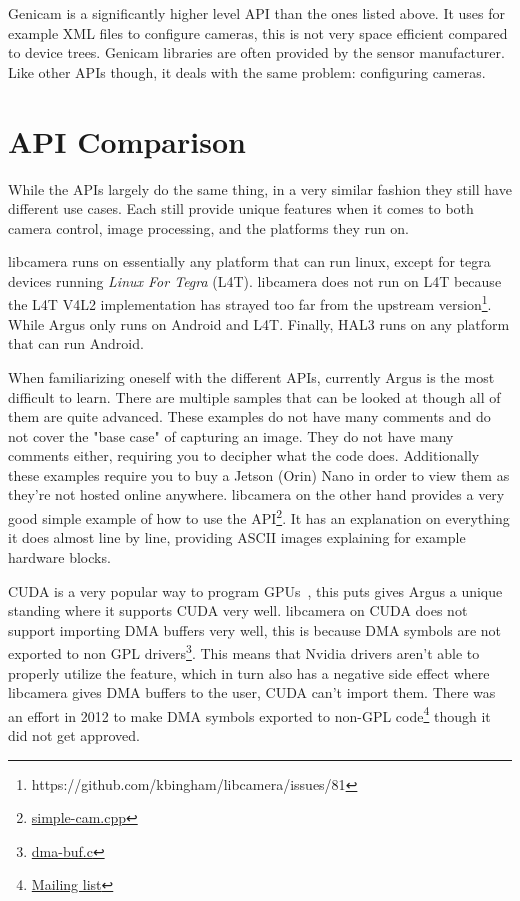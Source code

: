 Genicam is a significantly higher level API than the ones listed above. It
uses for example XML files to configure cameras, this is not very space
efficient compared to device trees. Genicam libraries are often provided by the
sensor manufacturer. Like other APIs though, it deals with the same problem:
configuring cameras.

\section{API Comparison}\label{section:comparison}
While the APIs largely do the same thing, in a very similar fashion they still
have different use cases. Each still provide unique features when it comes to
both camera control, image processing, and the platforms they run on.

libcamera runs on essentially any platform that can run linux, except for
tegra devices running \textit{Linux For Tegra} (L4T). libcamera does not run
on L4T because the L4T V4L2 implementation has strayed too far from the
upstream version\footnote{https://github.com/kbingham/libcamera/issues/81}.
While Argus only runs on Android and L4T. Finally, HAL3 runs on any platform
that can run Android.

When familiarizing oneself with the different APIs, currently Argus is the most
difficult to learn. There are multiple samples that can be looked
at though all of them are quite advanced. These examples do not
have many comments and do not cover the "base case" of capturing an image. They
do not have many comments either, requiring you to decipher what the code does.
Additionally these examples require you to buy a Jetson (Orin) Nano in order to
view them as they're not hosted online anywhere. libcamera on the other hand
provides a very good simple example of how to use the API\footnote{\href{https://github.com/kbingham/simple-cam/blob/master/simple-cam.cpp}{simple-cam.cpp}}.
It has an explanation on everything it does almost line by line, providing
ASCII images explaining for example hardware blocks.

CUDA is a very popular way to program GPUs~\cite{kalaiselvi2017survey}, this
puts gives Argus a unique standing where it supports CUDA very well. libcamera
on CUDA does not support importing DMA buffers very well, this is because DMA
symbols are not exported to non GPL drivers\footnote{\href{https://github.com/torvalds/linux/blob/master/drivers/dma-buf/dma-buf.c}{dma-buf.c}}.
This means that Nvidia drivers aren't able to properly utilize the feature,
which in turn also has a negative side effect where libcamera gives DMA buffers
to the user, CUDA can't import them. There was an effort in 2012 to make DMA
symbols exported to non-GPL code\footnote{\href{https://patchwork.kernel.org/project/dri-devel/patch/1349884592-32485-1-git-send-email-rmorell@nvidia.com/}{Mailing list}}
though it did not get approved.
